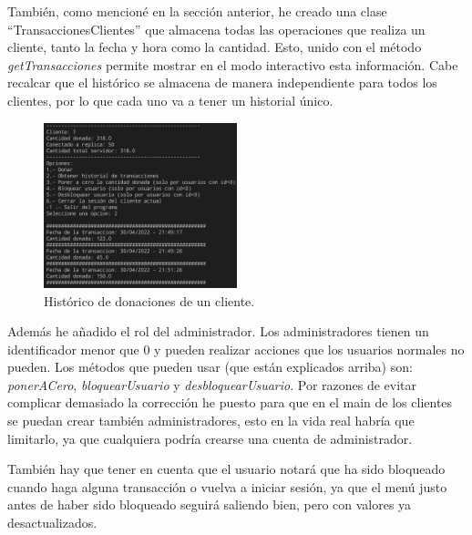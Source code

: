 \documentclass{article}
\begin{document}
También, como mencioné en la sección anterior, he creado una clase ``TransaccionesClientes'' que almacena todas las operaciones que realiza un cliente, tanto la fecha y hora como la cantidad. Esto, unido con el método \textit{getTransacciones} permite mostrar en el modo interactivo esta información. Cabe recalcar que el histórico se almacena de manera independiente para todos los clientes, por lo que cada uno va a tener un historial único.

\begin{figure}[H]
    \centering
    \includegraphics[width=0.5\textwidth]{imagenes/historico.png}
    \caption{Histórico de donaciones de un cliente.}
\end{figure}

Además he añadido el rol del administrador. Los administradores tienen un identificador menor que 0 y pueden realizar acciones que los usuarios normales no pueden. Los métodos que pueden usar (que están explicados arriba) son: \textit{ponerACero}, \textit{bloquearUsuario} y \textit{desbloquearUsuario}. Por razones de evitar complicar demasiado la corrección he puesto para que en el main de los clientes se puedan crear también administradores, esto en la vida real habría que limitarlo, ya que cualquiera podría crearse una cuenta de administrador.

\bigskip

También hay que tener en cuenta que el usuario notará que ha sido bloqueado cuando haga alguna transacción o vuelva a iniciar sesión, ya que el menú justo antes de haber sido bloqueado seguirá saliendo bien, pero con valores ya desactualizados.
\end{document}
